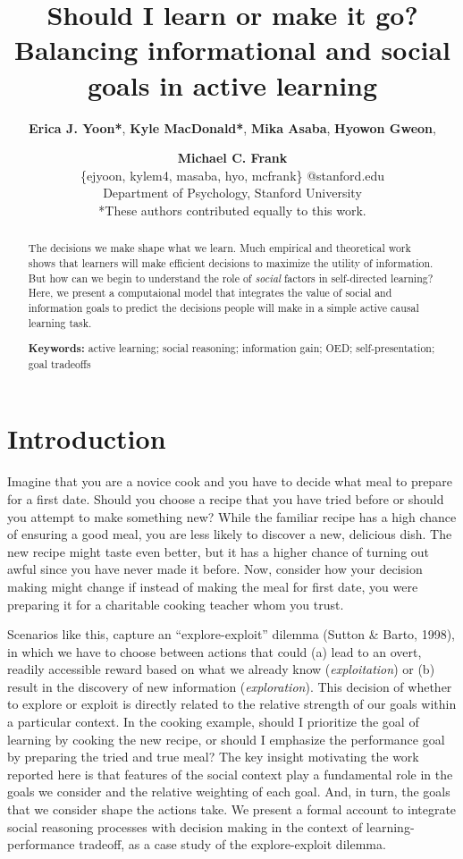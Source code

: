 \documentclass[10pt, letterpaper]{article}
\title{Should I learn or make it go? Balancing informational and social goals
in active learning}
\author{{\large \bf Erica J. Yoon*}, {\large \bf Kyle MacDonald*}, {\large \bf Mika Asaba}, {\large \bf Hyowon Gweon}, \and {\large \bf Michael C. Frank} \\ \{ejyoon, kylem4, masaba, hyo, mcfrank\} @stanford.edu \\ Department of Psychology, Stanford University \\ *These authors contributed equally to this work.}
\begin{document}
\maketitle

\begin{abstract}
The decisions we make shape what we learn. Much empirical and
theoretical work shows that learners will make efficient decisions to
maximize the utility of information. But how can we begin to understand
the role of \emph{social} factors in self-directed learning? Here, we
present a computaional model that integrates the value of social and
information goals to predict the decisions people will make in a simple
active causal learning task.

\textbf{Keywords:}
active learning; social reasoning; information gain; OED;
self-presentation; goal tradeoffs
\end{abstract}

\section{Introduction}\label{introduction}

Imagine that you are a novice cook and you have to decide what meal to
prepare for a first date. Should you choose a recipe that you have tried
before or should you attempt to make something new? While the familiar
recipe has a high chance of ensuring a good meal, you are less likely to
discover a new, delicious dish. The new recipe might taste even better,
but it has a higher chance of turning out awful since you have never
made it before. Now, consider how your decision making might change if
instead of making the meal for first date, you were preparing it for a
charitable cooking teacher whom you trust.

Scenarios like this, capture an ``explore-exploit'' dilemma (Sutton \&
Barto, 1998), in which we have to choose between actions that could (a)
lead to an overt, readily accessible reward based on what we already
know (\emph{exploitation}) or (b) result in the discovery of new
information (\emph{exploration}). This decision of whether to explore or
exploit is directly related to the relative strength of our goals within
a particular context. In the cooking example, should I prioritize the
goal of learning by cooking the new recipe, or should I emphasize the
performance goal by preparing the tried and true meal? The key insight
motivating the work reported here is that features of the social context
play a fundamental role in the goals we consider and the relative
weighting of each goal. And, in turn, the goals that we consider shape
the actions take. We present a formal account to integrate social
reasoning processes with decision making in the context of
learning-performance tradeoff, as a case study of the explore-exploit
dilemma.
\end{document}
